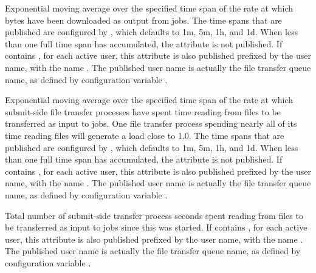 \begin{description}
\item[\AdAttr{FileTransferDownloadBytesPerSecond\_<timespan>}]
  Exponential moving average over the specified time span of the rate
  at which bytes have been downloaded as output from jobs.
  The time spans that are published are configured by
  , which defaults to
  1m, 5m, 1h, and 1d.  When less than one full time span has
  accumulated, the attribute is not published.
  If  contains ,
  for each active user, this attribute is also published prefixed by
  the user name, with the name 
  .
  The published user name is actually the file transfer queue name, as
  defined by configuration variable .

\item[\AdAttr{FileTransferFileReadLoad\_<timespan>}] Exponential
  moving average over the specified time span of the rate at which
  submit-side file transfer processes have spent time reading from
  files to be transferred as input to jobs.  One file transfer process
  spending nearly all of its time reading files will generate a load
  close to 1.0.
  The time spans that are published are configured by
  , which defaults to
  1m, 5m, 1h, and 1d.  When less than one full time span has
  accumulated, the attribute is not published.
  If  contains ,
  for each active user, this attribute is also published prefixed by
  the user name, with the name
  .
  The published user name is actually the file transfer queue name, as
  defined by configuration variable .

\item[\AdAttr{FileTransferFileReadSeconds}] Total number of
  submit-side transfer process seconds spent reading from files to be
  transferred as input to jobs since this  was started.
  If  contains ,
  for each active user, this attribute is also published prefixed by
  the user name, with the name
  .
  The published user name is actually the file transfer queue name, as
  defined by configuration variable .


\end{description}
